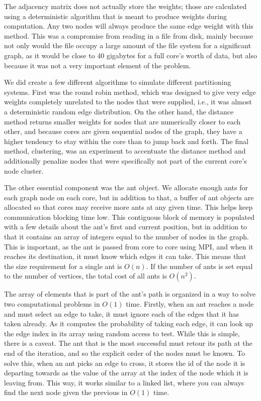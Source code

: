 \documentclass{acm_proc_article-sp}
\begin{document}
The adjacency matrix does not actually store the weights; those are calculated
using a deterministic algorithm that is meant to produce weights during
computation. Any two nodes will always produce the same edge weight with this
method. This was a compromise from reading in a file from disk, mainly because
not only would the file occupy a large amount of the file system for a
significant graph, as it would be close to 40 gigabytes for a full core's worth
of data, but also because it was not a very important element of the problem. 

We did create a few different algorithms to simulate different partitioning
systems. First was the round robin method, which was designed to give very edge
weights completely unrelated to the nodes that were supplied, i.e., it was
almost a deterministic random edge distribution. On the other hand, the distance
method returns smaller weights for nodes that are numerically closer to each
other, and because cores are given sequential nodes of the graph, they have a
higher tendency to stay within the core than to jump back and forth. The final
method, clustering, was an experiment to accentuate the distance method and
additionally penalize nodes that were specifically not part of the current
core's node cluster.

The other essential component was the ant object. We allocate enough ants for
each graph node on each core, but in addition to that, a buffer of ant objects
are allocated so that cores may receive more ants at any given time. This helps
keep communication blocking time low. This contiguous block of memory is
populated with a few details about the ant's first and current position, but in
addition to that it contains an array of integers equal to the number of nodes
in the graph. This is important, as the ant is passed from core to core using
MPI, and when it reaches its destination, it must know which edges it can take.
This means that the size requirement for a single ant is $O(n)$. If the number
of ants is set equal to the number of vertices, the total cost of all ants is
$O(n^2)$.

The array of elements that is part of the ant's path is organized in a way to
solve two computational problems in $O(1)$ time. Firstly, when an ant reaches a
node and must select an edge to take, it must ignore each of the edges that
it has taken already. As it computes the probability of taking each edge, it can
look up the edge index in its array using random access to test. While this is
simple, there is a caveat. The ant that is the most successful must retour its
path at the end of the iteration, and so the explicit order of the nodes must be
known. To solve this, when an ant picks an edge to cross, it stores the id of
the node it is departing towards as the value of the array at the index of the
node which it is leaving from. This way, it works similar to a linked list,
where you can always find the next node given the previous in $O(1)$ time.
\end{document}
